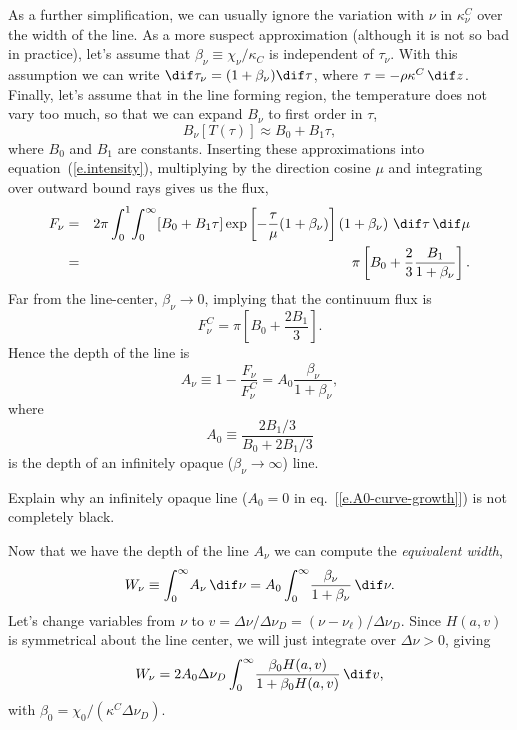 As a further simplification, we can usually ignore the variation with $\nu$ in $\kappa_{\nu}^{C}$ over the width of the line. As a more suspect approximation (although it is not so bad in practice), let's assume that $\beta_{\nu} \equiv \chi_{\nu}/\kappa_{C}$ is independent of $\tau_{\nu}$. With this assumption we can write $\dif\tau_{\nu} = (1+\beta_{\nu})\dif\tau$, where $\tau = -\rho\kappa^{C}\,\dif z$. Finally, let's assume that in the line forming region, the temperature does not vary too much, so that we can expand $B_{\nu}$ to first order in $\tau$,
\[ B_{\nu}[T(\tau)] \approx B_{0} + B_{1}\tau, \]
where $B_{0}$ and $B_{1}$ are constants.
Inserting these approximations into equation~(\ref{e.intensity}), multiplying by the direction cosine $\mu$ and integrating over outward bound rays gives us the flux,
\begin{eqnarray}\label{e.flux}
F_{\nu} &=& 2\pi\int_{0}^{1}\!\int_{0}^{\infty}\!\left[B_{0}+B_{1}\tau\right]\exp\left[-\frac{\tau}{\mu}(1+\beta_{\nu})\right] \left(1+\beta_{\nu}\right) \,\dif\tau\,\dif\mu\nonumber\\
 &=& \pi\left[ B_{0} + \frac{2}{3}\frac{B_{1}}{1+\beta_{\nu}}\right].
\end{eqnarray}
Far from the line-center, $\beta_{\nu}\to 0$, implying that the continuum flux is
\[ F_{\nu}^{C} = \pi\left[B_{0} + \frac{2B_{1}}{3}\right]. \]
Hence the depth of the line is
\begin{equation}\label{e.line-depth}
A_{\nu} \equiv 1 - \frac{F_{\nu}}{F_{\nu}^{C}} = A_{0}\frac{\beta_{\nu}}{1+\beta_{\nu}},
\end{equation}
where
\begin{equation}\label{e.A0-curve-growth}
 A_{0} \equiv \frac{2B_{1}/3}{B_{0} + 2B_{1}/3}
 \end{equation}
is the depth of an infinitely opaque ($\beta_{\nu}\to\infty$) line. 

\begin{exercisebox} Explain why an infinitely opaque line ($A_{0}=0$ in eq.~[\ref{e.A0-curve-growth}]) is not completely black.
\end{exercisebox}

Now that we have the depth of the line $A_{\nu}$ we can compute the \emph{equivalent width},
\begin{equation}\label{e.W}
W_{\nu} \equiv \int_{0}^{\infty}\! A_{\nu}\,\dif\nu = A_{0}\int_{0}^{\infty}\!\frac{\beta_{\nu}}{1+\beta_{\nu}}\,\dif\nu.
\end{equation}
Let's change variables from $\nu$ to $v = \Delta\nu/\Delta\nu_{D} = (\nu-\nu_{\ell})/\Delta\nu_{D}$.  Since $H(a,v)$ is symmetrical about the line center, we will just integrate over $\Delta\nu >0$, giving
\begin{equation}\label{e.Wv}
 W_{\nu} = 2A_{0}\Delta\nu_{D}\int_{0}^{\infty}\!\frac{\beta_{0}H(a,v)}{1+\beta_{0}H(a,v)}\,\dif v,
 \end{equation}
with $\beta_{0} = \chi_{0}/(\kappa^{C}\Delta\nu_{D})$.


